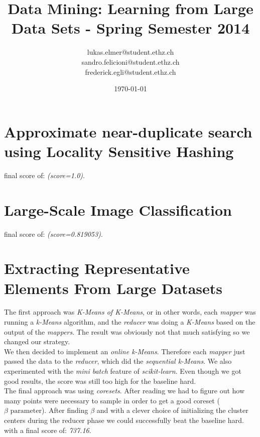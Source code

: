 \documentclass[a4paper, 11pt]{article}
\title{Data Mining: Learning from Large Data Sets - Spring Semester 2014}
\author{lukas.elmer@student.ethz.ch\\ sandro.felicioni@student.ethz.ch\\ frederick.egli@student.ethz.ch\\}
\date{\today}
\begin{document}
\maketitle

\section{Approximate near-duplicate search using Locality Sensitive Hashing} 

final score of: \emph{(score=1.0)}.
\section{Large-Scale Image Classification}

final score of: \emph{(score=0.819053)}.


\section{Extracting Representative Elements From Large Datasets}
The first approach was \emph{K-Means of K-Means}, or in other words, each \emph{mapper} was running a \emph{k-Means} algorithm, and the \emph{reducer} was doing a \emph{K-Means} based on the output of the \emph{mappers}. The result was obviously not that much satisfying so we changed our strategy. \\

We then decided to implement an \emph{online k-Means}. Therefore each \emph{mapper} just passed the data to the \emph{reducer}, which did the \emph{sequential k-Means}. We also experimented with the \emph{mini batch} feature of \emph{scikit-learn}. Even though we got good results, the score was still too high for the baseline hard.\\

The final approach was using \emph{coresets}. After reading \cite{coreset} we had to figure out how many points were necessary to sample in order to get a good coreset ($\beta \text{ parameter}$). After finding $\beta$ and with a clever choice of initializing the cluster centers during the reducer phase we could successfully beat the baseline hard. with a final score of: \emph{737.16}.
\end{document}
